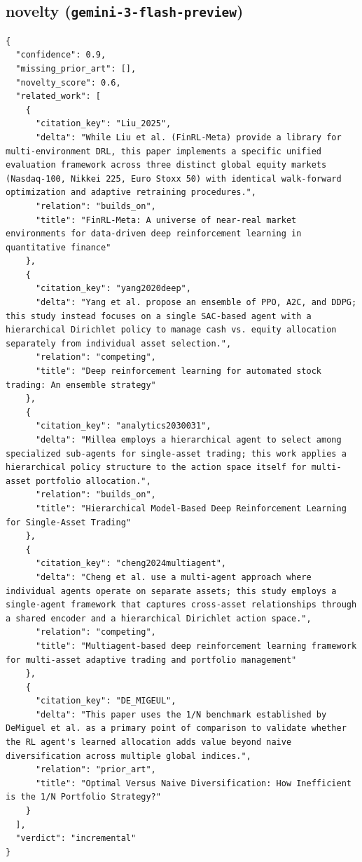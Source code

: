 \documentclass[11pt]{article}
\begin{document}
\subsection*{novelty (\texttt{gemini-3-flash-preview})}
\begin{verbatim}
{
  "confidence": 0.9,
  "missing_prior_art": [],
  "novelty_score": 0.6,
  "related_work": [
    {
      "citation_key": "Liu_2025",
      "delta": "While Liu et al. (FinRL-Meta) provide a library for multi-environment DRL, this paper implements a specific unified evaluation framework across three distinct global equity markets (Nasdaq-100, Nikkei 225, Euro Stoxx 50) with identical walk-forward optimization and adaptive retraining procedures.",
      "relation": "builds_on",
      "title": "FinRL-Meta: A universe of near-real market environments for data-driven deep reinforcement learning in quantitative finance"
    },
    {
      "citation_key": "yang2020deep",
      "delta": "Yang et al. propose an ensemble of PPO, A2C, and DDPG; this study instead focuses on a single SAC-based agent with a hierarchical Dirichlet policy to manage cash vs. equity allocation separately from individual asset selection.",
      "relation": "competing",
      "title": "Deep reinforcement learning for automated stock trading: An ensemble strategy"
    },
    {
      "citation_key": "analytics2030031",
      "delta": "Millea employs a hierarchical agent to select among specialized sub-agents for single-asset trading; this work applies a hierarchical policy structure to the action space itself for multi-asset portfolio allocation.",
      "relation": "builds_on",
      "title": "Hierarchical Model-Based Deep Reinforcement Learning for Single-Asset Trading"
    },
    {
      "citation_key": "cheng2024multiagent",
      "delta": "Cheng et al. use a multi-agent approach where individual agents operate on separate assets; this study employs a single-agent framework that captures cross-asset relationships through a shared encoder and a hierarchical Dirichlet action space.",
      "relation": "competing",
      "title": "Multiagent-based deep reinforcement learning framework for multi-asset adaptive trading and portfolio management"
    },
    {
      "citation_key": "DE_MIGEUL",
      "delta": "This paper uses the 1/N benchmark established by DeMiguel et al. as a primary point of comparison to validate whether the RL agent's learned allocation adds value beyond naive diversification across multiple global indices.",
      "relation": "prior_art",
      "title": "Optimal Versus Naive Diversification: How Inefficient is the 1/N Portfolio Strategy?"
    }
  ],
  "verdict": "incremental"
}
\end{verbatim}
\end{document}
